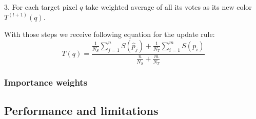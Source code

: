 \vspace{15px}
3. For each target pixel $q$ take weighted average of all its votes as its new color $T^{(l+1)}(q)$.

\vspace{15px}
With those steps we receive following equation for the update rule:
\large
\begin{equation}
\label{Eq:Update rule}
T(q)=\frac{\frac{1}{N_{S}} \sum_{j=1}^{n} S(\hat{p}_{j}) + \frac{1}{N_{T}} \sum_{i=1}^{m} S(p_{i})}{\frac{n}{N_{S}} + \frac{m}{N_{T}}}
\end{equation}
\normalsize

\subsubsection{Importance weights}
\subsection{Performance and limitations}